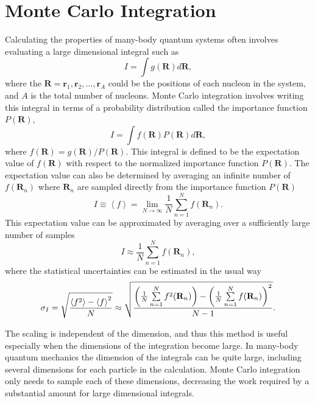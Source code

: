 \section{Monte Carlo Integration}
Calculating the properties of many-body quantum systems often involves evaluating a large dimensional integral such as
\begin{equation}
   I=\int g(\mathbf{R}) d\mathbf{R},
\end{equation}
where the $\mathbf{R}=\mathbf{r}_1,\mathbf{r}_2,\ldots,\mathbf{r}_A$ could be the positions of each nucleon in the system, and $A$ is the total number of nucleons. Monte Carlo integration involves writing this integral in terms of a probability distribution called the importance function $P(\mathbf{R})$,
\begin{equation}
   I=\int f(\mathbf{R}) P(\mathbf{R}) d\mathbf{R},
\end{equation}
where $f(\mathbf{R}) = g(\mathbf{R})/P(\mathbf{R})$. This integral is defined to be the expectation value of $f(\mathbf{R})$ with respect to the normalized importance function $P(\mathbf{R})$. The expectation value can also be determined by averaging an infinite number of $f(\mathbf{R}_n)$ where $\mathbf{R}_n$ are sampled directly from the importance function $P(\mathbf{R})$
\begin{equation}
   I \equiv \left<f\right> = \lim\limits_{N\rightarrow\infty} \frac{1}{N} \sum\limits_{n=1}^N f(\mathbf{R}_n).
   \label{equ:mci}
\end{equation}
This expectation value can be approximated by averaging over a sufficiently large number of samples
\begin{equation}
   I \approx \frac{1}{N} \sum\limits_{n=1}^N f(\mathbf{R}_n),
\end{equation}
where the statistical uncertainties can be estimated in the usual way
\begin{equation}
   \sigma_{I} = \sqrt{\frac{\left< f^2 \right>-\left< f \right>^2}{N}} \approx \sqrt{\frac{\left(\frac{1}{N}\sum\limits_{n=1}^Nf^2(\mathbf{R}_n)\right) - \left(\frac{1}{N}\sum\limits_{n=1}^Nf(\mathbf{R}_n)\right)^2}{N-1}}.
\end{equation}

The scaling is independent of the dimension, and thus this method is useful especially when the dimensions of the integration become large. In many-body quantum mechanics the dimension of the integrals can be quite large, including several dimensions for each particle in the calculation. Monte Carlo integration only needs to sample each of these dimensions, decreasing the work required by a substantial amount for large dimensional integrals.


